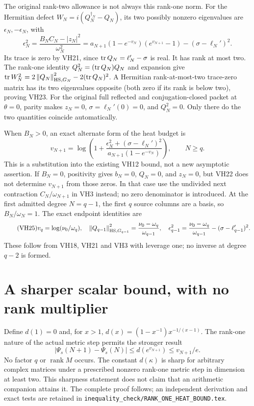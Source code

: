 \documentclass[11pt]{article}
\begin{document}
The original rank-two allowance is not always this rank-one norm.
For the Hermitian defect \(W_N=i(Q_N^{\dagger_N}-Q_N)\), its two
possibly nonzero eigenvalues are \(\epsilon_N,-\epsilon_N\), with
\begin{equation}\tag{VH23}\label{hvh:VH23}
\boxed{\quad
\epsilon_N^2=\frac{B_NC_N-|z_N|^2}{\omega_N^2}
=a_{N+1}(1-e^{-v_N})(e^{v_{N+1}}-1)
-(\sigma-\ell_N')^2.\quad}
\end{equation}
Its trace is zero by VH21, since \(\operatorname{tr} Q_N=\ell_N'-\sigma\) is real.
It has rank at most two. The rank-one identity
\(Q_N^2=(\operatorname{tr} Q_N)Q_N\) and expansion give
\(\operatorname{tr} W_N^2=2\left\lVert Q_N\right\rVert_{\mathrm{HS},G_N}^2-2(\operatorname{tr} Q_N)^2\).
A Hermitian rank-at-most-two trace-zero matrix has its two eigenvalues
opposite (both zero if its rank is below two), proving VH23.
For the original full reflected and conjugation-closed packet at
\(\theta=0\), parity makes \(z_N=0\), \(\sigma=\ell_N'(0)=0\),
and \(Q_N^2=0\). Only there do the two quantities coincide automatically.

When \(B_N>0\), an exact alternate form of the heat budget is
\begin{equation}\tag{VH24}\label{hvh:VH24}
v_{N+1}=\log\!\left(1+
\frac{\epsilon_N^2+(\sigma-\ell_N')^2}
{a_{N+1}(1-e^{-v_N})}\right),\qquad N\ge q.
\end{equation}
This is a substitution into the existing VH12 bound, not a new
asymptotic assertion. If \(B_N=0\), positivity gives \(b_N=0\),
\(Q_N=0\), and \(z_N=0\), but VH22 does not determine \(v_{N+1}\)
from those zeros. In that case use the undivided next contraction
\(C_N/\omega_{N+1}\) in VH3 instead; no zero denominator is introduced.
At the first admitted degree \(N=q-1\), the first \(q\) source columns
are a basis, so \(B_N/\omega_N=1\). The exact endpoint identities are
\begin{equation}\tag{VH25}\label{hvh:VH25}
v_q=\log(\nu_0/\omega_q),\quad
\left\lVert Q_{q-1}\right\rVert_{\mathrm{HS},G_{q-1}}^2
=\frac{\nu_0-\omega_q}{\omega_{q-1}},\quad
\epsilon_{q-1}^2=\frac{\nu_0-\omega_q}{\omega_{q-1}}
-(\sigma-\ell_{q-1}')^2.
\end{equation}
These follow from VH18, VH21 and VH3 with leverage one; no inverse
at degree \(q-2\) is formed.

\section{A sharper scalar bound, with no rank multiplier}

Define \(d(1)=0\) and, for \(x>1\),
\(d(x)=(1-x^{-1})x^{-1/(x-1)}\). The rank-one nature of the actual
metric step permits the stronger result
\begin{equation}\tag{VH26}\label{hvh:VH26}
\boxed{\quad
|\Psi_s(N+1)-\Psi_s(N)|\le d(e^{v_{N+1}})
\le v_{N+1}/e.\quad}
\end{equation}
No factor \(q\) or \(\operatorname{rank}M\) occurs. The constant
\(d(\kappa)\) is sharp for arbitrary complex matrices under a prescribed
nonzero rank-one metric step in dimension at least two. This sharpness
statement does not claim that an arithmetic companion attains it.
The complete proof follows; an independent derivation and exact tests
are retained in \texttt{inequality\_check/RANK\_ONE\_HEAT\_BOUND.tex}.
\end{document}
